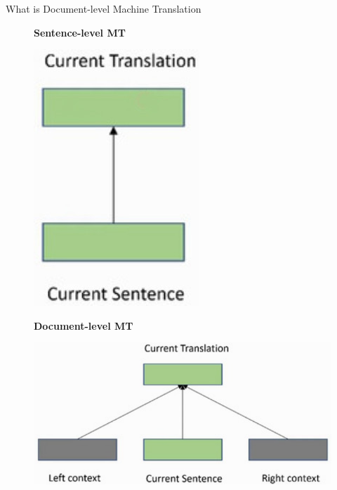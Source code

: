 
\begin{frame}{What is Document-level Machine Translation}
	\begin{figure}
	\centering
	\begin{minipage}{.4\textwidth}
		\centering
		\textbf{Sentence-level MT}\par\medskip
		\includegraphics[width=.4\linewidth]{Images/dlmt}
	\end{minipage}%
	\begin{minipage}{.6\textwidth}
		\centering
		\textbf{Document-level MT}\par\medskip
		\includegraphics[width=.85\linewidth]{Images/slmt}
	\end{minipage}
	\end{figure}	
\end{frame}


